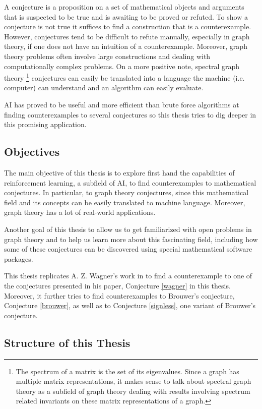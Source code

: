 \documentclass[11pt]{article}
\theoremstyle{definition}
\begin{document}
A conjecture is a proposition on a set of mathematical objects and arguments that is suspected to be true and is awaiting to be proved or refuted. To show a conjecture is not true it suffices to find a construction that is a counterexample. However, conjectures tend to be difficult to refute manually, especially in graph theory, if one does not have an intuition of a counterexample. Moreover, graph theory problems often involve large constructions and dealing with computationally complex problems. On a more positive note, spectral graph theory \footnote{The spectrum of a matrix is the set of its eigenvalues. Since a graph has multiple matrix representations, it makes sense to talk about spectral graph theory as a subfield of graph theory dealing with results involving spectrum related invariants on these matrix representations of a graph.} conjectures can easily be translated into a language the machine (i.e. computer) can understand and an algorithm can easily evaluate. 

AI has proved to be useful and more efficient than brute force algorithms at finding counterexamples to several conjectures so this thesis tries to dig deeper in this promising application. 

\subsection{Objectives}

The main objective of this thesis is to explore first hand the capabilities of reinforcement learning, a subfield of AI, to find counterexamples to mathematical conjectures. In particular, to graph theory conjectures, since this mathematical field and its concepts can be easily translated to machine language. Moreover, graph theory has a lot of real-world applications.

Another goal of this thesis to allow us to get familiarized with open problems in graph theory and to help us learn more about this fascinating field, including how some of these conjectures can be discovered using special mathematical software packages. 

This thesis replicates A. Z. Wagner's work in \cite{Wagner:2021} to find a counterexample to one of the conjectures presented in his paper, Conjecture \ref{wagner} in this thesis. Moreover, it further tries to find counterexamples to Brouwer's conjecture, Conjecture \ref{brouwer}, as well as to Conjecture \ref{signless}, one variant of Brouwer's conjecture.

\subsection{Structure of this Thesis}
\end{document}
